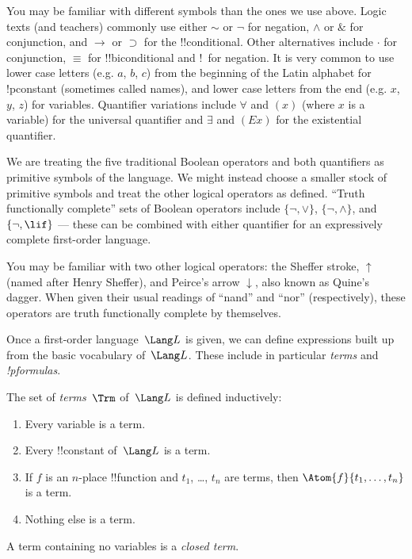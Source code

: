 \documentclass[../../include/open-logic-section]{subfiles}
\begin{document}

\begin{intro}
You may be familiar with different symbols than the ones we use
above. Logic texts (and teachers) commonly use either $\sim$ or $\neg$
for negation, $\wedge$ or $\&$ for conjunction, and $\rightarrow$ or
$\supset$ for the !!{conditional}. Other alternatives include $\cdot$ for
conjunction, $\equiv$ for !!{biconditional} and !~for negation. It is very
common to use lower case letters (e.g. $a$, $b$, $c$) from the
beginning of the Latin alphabet for !p{constant} (sometimes called
names), and lower case letters from the end (e.g. $x$, $y$, $z$)
for variables. Quantifier variations include $\forall$ and $(x)$
(where $x$ is a variable) for the universal quantifier and
$\exists$ and $(Ex)$ for the existential quantifier.
\end{intro}


\begin{explain}
We are treating the five traditional Boolean operators and both 
quantifiers as primitive symbols of the language. We might instead 
choose a smaller stock of primitive symbols and treat the other logical 
operators as defined. ``Truth functionally complete'' sets of Boolean 
operators include $\{ \lnot, \lor \}$, $\{ \lnot, \land \}$, and $\{ \lnot, \lif\}$ 
--- these can be combined with either quantifier for an expressively 
complete first-order language.

You may be familiar with two other logical operators: the Sheffer stroke, $\uparrow$ (named after Henry Sheffer), and Peirce's arrow $\downarrow$, also known as Quine's dagger. When given their usual readings of ``nand'' and ``nor'' (respectively), these operators are truth functionally complete by themselves.

Once a first-order language~$\Lang L$ is given, we can define
expressions built up from the basic vocabulary of~$\Lang L$.  These
include in particular \emph{terms} and \emph{!p{formulas}}.
\end{explain}

\begin{defn}[Term]
The set of \emph{terms}~$\Trm$ of~$\Lang L$ is
defined inductively:
\begin{enumerate}
\item Every variable is a term.
\item Every !!{constant} of~$\Lang L$ is a term.
\item If $f$ is an $n$-place !!{function} and $t_1$, \dots, $t_n$
  are terms, then $\Atom{f}{t_1, \ldots, t_n}$ is a term.
\item Nothing else is a term.
\end{enumerate}
A term containing no variables is a \emph{closed term}.
\end{defn}
\end{document}
